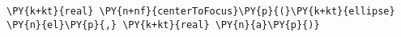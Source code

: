 \begin{Verbatim}[commandchars=\\\{\}]
    \PY{k+kt}{real} \PY{n+nf}{centerToFocus}\PY{p}{(}\PY{k+kt}{ellipse} \PY{n}{el}\PY{p}{,} \PY{k+kt}{real} \PY{n}{a}\PY{p}{)}
\end{Verbatim}
